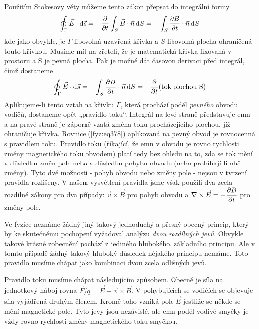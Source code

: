   Použitím Stokesovy věty můžeme tento zákon přepsat do integrální formy
  \begin{equation}\label{fyz:eq379}
    \oint_\Gamma\vec{E}\cdot\mathop{}\!\mathrm{d}\vec{s} 
      = -\dfrac{\partial  }{\partial t}\int_S\vec{B}\cdot\vec{n}\mathop{}\!\mathrm{d}S = -\int_S\dfrac{\partial B}{\partial t}\cdot\vec{n}\mathop{}\!\mathrm{d}S
  \end{equation}
  kde jako obvykle, je \(\Gamma\) libovolná uzavřená křivka a \(S\) libovolná plocha ohraničená 
  touto křivkou. Musíme mít na zřeteli, že je matematická křivka fixovaná v prostoru a S je pevná 
  plocha. Pak je možné dát časovou derivaci před integrál, čímž dostaneme
  \begin{equation}\label{fyz:eq380}
    \oint_\Gamma\vec{E}\cdot\mathop{}\!\mathrm{d}\vec{s} 
      = -\int_S\dfrac{\partial B}{\partial t}\cdot\vec{n}\mathop{}\!\mathrm{d}S = -\dfrac{\partial  }{\partial t}(\text{tok plochou S})
  \end{equation}
  Aplikujeme-li tento vztah na křivku \(\Gamma\), která prochází podél \emph{pevného} obvodu 
  vodičů, dostaneme opět „pravidlo toku“. Integrál na levé straně představuje emn a na pravé straně 
  je záporně vzatá změna toku procházejícího plochou, jíž ohraničuje křivka. Rovnice 
  (\ref{fyz:eq378}) aplikovaná na pevný obvod je rovnocenná s pravidlem toku. Pravidlo toku 
  (říkající, že emn v obvodu je rovno rychlosti změny magnetického toku obvodem) platí tedy bez 
  ohledu na to, zda se tok mění v důsledku změn pole nebo v důsledku pohybu obvodu (nebo 
  probíhají-li obě změny). Tyto dvě možnosti - pohyb obvodu nebo změny pole - nejsou v tvrzení 
  pravidla rozlišeny. V našem vysvětlení pravidla jsme však použili dva zcela rozdílné zákony pro 
  dva případy: \(\vec{v}\times\vec{B}\) pro pohyb obvodu a \(\nabla\times\vec{E} = -\dfrac{\partial B}{\partial t}\) 
  pro změny pole.
  
  Ve fyzice neznáme žádný jiný takový jednoduchý a přesný obecný princip, který by ke skutečnému 
  pochopení vyžadoval analýzu \emph{dvou rozdílných jevů}. Obvykle takové krásné zobecnění pochází 
  z jediného hlubokého, základního principu. Ale v tomto případě žádný takový hluboký důsledek 
  nějakého principu nemáme. Toto pravidlo musíme chápat jako kombinaci dvou zcela odlišných jevů.
  
  Pravidlo toku musíme chápat následujícím způsobem. Obecně je síla na jednotkový náboj rovna 
  \(\vec{F}/q = \vec{E}+\vec{v}\times\vec{B}\). V pohybujících se vodičích se objevuje síla 
  vyjádřená druhým členem. Kromě toho vzniká pole \(\vec{E}\) jestliže se někde se mění magnetické 
  pole. Tyto jevy jsou nezávislé, ale emn podél vodivé smyčky je vždy rovno rychlosti změny 
  magnetického toku smyčkou.
  
